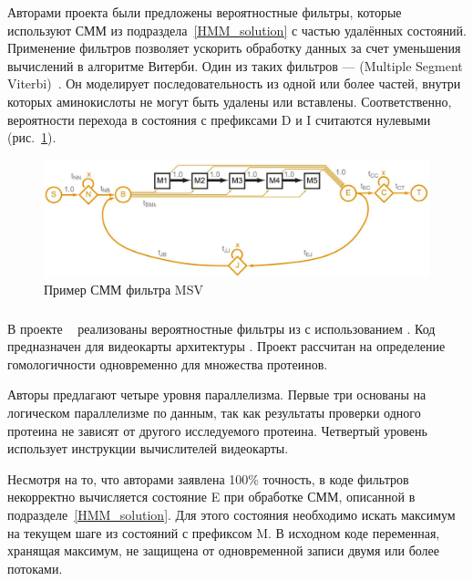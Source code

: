 Авторами проекта были предложены вероятностные фильтры, которые используют СММ 
из подраздела~\ref{HMM_solution} с частью удалённых состояний.
Применение фильтров позволяет ускорить обработку данных за счет уменьшения
вычислений в алгоритме Витерби.
Один из таких фильтров ---  (Multiple Segment 
Viterbi)~\cite{MSV_Eddy}.
Он моделирует последовательность из одной или более частей, внутри которых
аминокислоты не могут быть удалены или вставлены.
Соответственно, вероятности перехода в состояния с префиксами D и I считаются 
нулевыми (рис.~\ref{MSV_example}).
\begin{figure}
  \centering
  \includegraphics[width=\columnwidth]{MSV.png}
  \caption{Пример СММ фильтра MSV~\cite{MSV_Eddy}}
  \label{MSV_example}
\end{figure}

\subsubsection{}
В проекте ~\cite{cudampf} реализованы вероятностные фильтры из 
 с использованием .
Код предназначен для видеокарты   архитектуры
.
Проект рассчитан на определение гомологичности одновременно для множества 
протеинов.

Авторы предлагают четыре уровня параллелизма.
Первые три основаны на логическом параллелизме по данным, так как результаты 
проверки одного протеина не зависят от другого исследуемого протеина.
Четвертый уровень использует  инструкции вычислителей видеокарты.

Несмотря на то, что авторами заявлена 100\% точность, в коде фильтров
некорректно вычисляется состояние E при обработке СММ, описанной в 
подразделе~\ref{HMM_solution}.
Для этого состояния необходимо искать максимум на текущем шаге из состояний с 
префиксом M.
В исходном коде  переменная, хранящая максимум, не защищена от 
одновременной записи двумя или более потоками.
